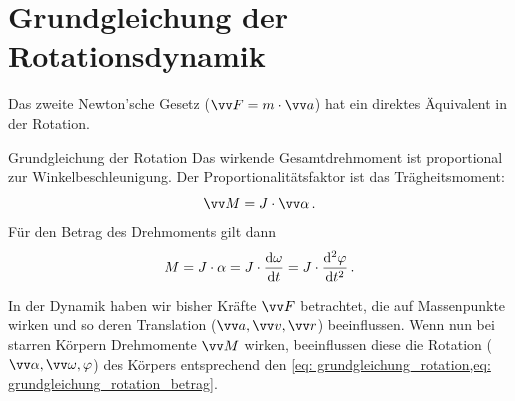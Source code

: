 \section{Grundgleichung der Rotationsdynamik}\label{sec: rotationsdynamik}
Das zweite Newton'sche Gesetz ($\ivec{F} = m \cdot \ivec{a}$) hat ein direktes Äquivalent in der Rotation.

\begin{importantbox}{Grundgleichung der Rotation}
    Das wirkende Gesamtdrehmoment ist proportional zur Winkelbeschleunigung. Der Proportionalitätsfaktor ist das Trägheitsmoment:
    \begin{equation}\label{eq: grundgleichung_rotation}
        \ivec{M} = J \cdot \ivec{\alpha} \mDot
    \end{equation}
    Für den Betrag des Drehmoments gilt dann 
    \begin{equation}\label{eq: grundgleichung_rotation_betrag}
        M = J \cdot \alpha = J \cdot \frac{\mathrm{d} \omega}{\mathrm{d} t} = J \cdot \frac{\mathrm{d}^2 \varphi}{\mathrm{d} t^2}\,.
    \end{equation}
\end{importantbox}
In der Dynamik haben wir bisher Kräfte $\ivec{F}$ betrachtet, die auf Massenpunkte wirken und so deren Translation ($\ivec{a}, \ivec{v}, \ivec{r}$) beeinflussen. Wenn nun bei starren Körpern Drehmomente $\ivec{M}$ wirken, beeinflussen diese die Rotation ($\ivec{\alpha}, \ivec{\omega}, \varphi$) des Körpers entsprechend den \cref{eq: grundgleichung_rotation,eq: grundgleichung_rotation_betrag}.

